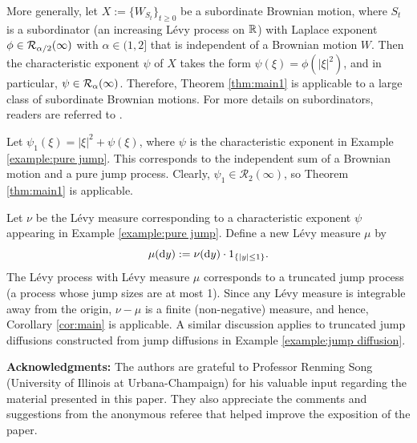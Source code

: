 \documentclass[11pt]{article}
\begin{document}
\begin{doublespace}
\begin{example}
\begin{em}
More generally, let $X:=\{W_{S_t}\}_{t\ge 0}$ be a subordinate Brownian motion, where $S_{t}$ is a subordinator (an increasing L\'evy process on ${\mathbb R}$) with Laplace exponent $\phi\in {\mathcal R}_{\alpha/2}(\infty)$ with $\alpha\in (1,2]$ that is independent of a Brownian motion $W$. Then the characteristic exponent $\psi$ of $X$ takes the form $\psi(\xi)=\phi(|\xi|^2)$, and in particular, $\psi\in{\mathcal R}_{\alpha}(\infty)$. Therefore, Theorem \ref{thm:main1} is applicable to a large class of subordinate Brownian motions.
For more details on subordinators, readers are referred to \cite{SSV}. 
\end{em}
\end{example}

\begin{example}\label{example:jump diffusion}
\begin{em}
Let $\psi_1(\xi)=|\xi|^2 + \psi(\xi)$, where $\psi$ is the characteristic exponent in Example \ref{example:pure jump}. 
This corresponds to the independent sum of a Brownian motion and a pure jump process. Clearly, $\psi_1\in \mathcal{R}_{2}(\infty)$, so Theorem \ref{thm:main1} is applicable. 
\end{em}
\end{example}

\begin{example}
\begin{em} 
Let $\nu$ be the L\'evy measure corresponding to a characteristic exponent $\psi$ appearing in Example \ref{example:pure jump}. Define a new L\'evy measure $\mu$ by
\[
\mu(\mathrm{d} y):=\nu(\mathrm{d} y)\cdot 1_{\{|y|\leq 1\}}.
\]
The L\'evy process with L\'evy measure $\mu$ corresponds to a truncated jump process (a process whose jump sizes are at most 1).
Since any L\'evy measure is integrable away from the origin, $\nu-\mu$ is a finite (non-negative) measure, and hence, Corollary \ref{cor:main} is applicable. 
A similar discussion applies to truncated jump diffusions constructed from jump diffusions in Example \ref{example:jump diffusion}. 
\end{em}
\end{example}



\bigskip
\noindent
{\bf Acknowledgments:}
The authors are grateful to Professor Renming Song (University of Illinois at Urbana-Champaign) for his valuable input regarding the material presented in this paper. 
They also appreciate the comments and suggestions from the anonymous referee that helped improve the exposition of the paper.
\bigskip
\noindent




\end{doublespace}
\end{document}
